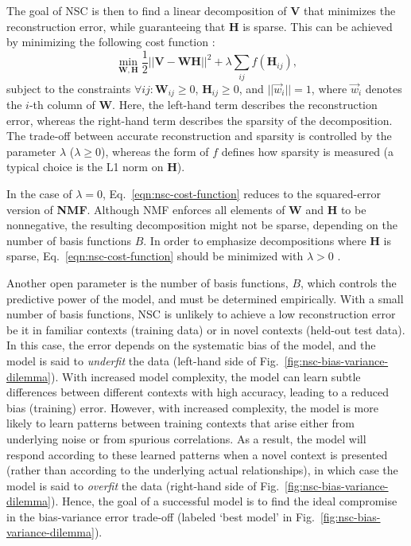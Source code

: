 The goal of \ac{NSC} is then to find a linear decomposition of \textbf{V}
that minimizes the reconstruction error,
while guaranteeing that \textbf{H} is sparse.
This can be achieved by minimizing the following cost function
\cite{Hoyer2002}:
\begin{equation}
\min_{\mathbf{W}, \mathbf{H}} \frac{1}{2} ||\mathbf{V} -\mathbf{WH}||^2 + \lambda \sum_{ij} f(\mathbf{H}_{ij}),
\label{eqn:nsc-cost-function}
\end{equation}
subject to the constraints
$\forall ij: \mathbf{W}_{ij} \geq 0$, $\mathbf{H}_{ij} \geq 0$, and
$||\vec{w}_i|| = 1$, where $\vec{w}_i$ denotes the 
$i$-th column of \textbf{W}.
Here, the left-hand term describes the reconstruction error,
whereas the right-hand term describes the sparsity of the decomposition.
The trade-off between accurate reconstruction and sparsity
is controlled by the parameter $\lambda$ ($\lambda \geq 0$), whereas
the form of $f$ defines how sparsity is measured
(a typical choice is the L1 norm on \textbf{H}).

In the case of $\lambda = 0$, Eq.~\ref{eqn:nsc-cost-function}
reduces to the squared-error version of \textbf{\ac{NMF}}.
Although \ac{NMF} enforces all elements of \textbf{W} and \textbf{H}
to be nonnegative,
the resulting decomposition might not be sparse,
depending on the number of basis functions $B$.
In order to emphasize decompositions where \textbf{H} is sparse,
Eq.~\ref{eqn:nsc-cost-function} should be minimized 
with $\lambda > 0$ \cite{Hoyer2002}.

Another open parameter is the number of basis functions, $B$, 
which controls the predictive power of the model,
and must be determined empirically.
With a small number of basis functions,
\ac{NSC} is unlikely to achieve a low reconstruction error
be it in familiar contexts (training data) or in novel contexts
(held-out test data).
In this case, the error depends on the systematic bias of the model,
and the model is said to \emph{underfit} the data
(left-hand side of Fig.~\ref{fig:nsc-bias-variance-dilemma}).
With increased model complexity,
the model can learn subtle differences 
between different contexts with high accuracy,
leading to a reduced bias (training) error.
However, with increased complexity, the model is more likely to learn
patterns between training contexts that arise either from underlying noise
or from spurious correlations. As a result,
the model will respond according to
these learned patterns when a novel context is presented
(rather than according to the underlying actual relationships), 
in which case the model is said to \emph{overfit} the data
(right-hand side of Fig.~\ref{fig:nsc-bias-variance-dilemma}).
Hence, the goal of a successful model is to find the ideal compromise
in the bias-variance error trade-off \cite{Beyeler2017}
(labeled `best model' in Fig.~\ref{fig:nsc-bias-variance-dilemma}).

